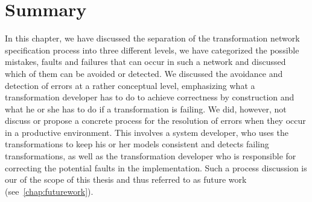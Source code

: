 \section{Summary}

In this chapter, we have discussed the separation of the transformation network specification process into three different levels, we have categorized the possible mistakes, faults and failures that can occur in such a network and discussed which of them can be avoided or detected.
We discussed the avoidance and detection of errors at a rather conceptual level, emphasizing what a transformation developer has to do to achieve correctness by construction and what he or she has to do if a transformation is failing.
We did, however, not discuss or propose a concrete process for the resolution of errors when they occur in a productive environment.
This involves a system developer, who uses the transformations to keep his or her models consistent and detects failing transformations, as well as the transformation developer who is responsible for correcting the potential faults in the implementation.
Such a process discussion is our of the scope of this thesis and thus referred to as future work (see~\autoref{chap:futurework}).



